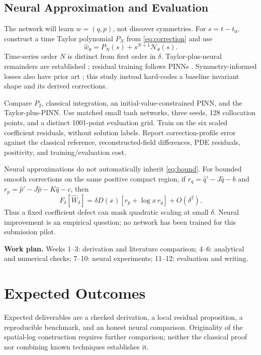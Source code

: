 \documentclass[12pt,a4paper]{article}
\begin{document}
\newpage
\subsection{Neural Approximation and Evaluation}
The network will learn $w=(q,p)$, not discover symmetries. For $s=t-t_0$, construct a time Taylor polynomial $P_N$ from \eqref{eq:correction} and use
\[
\widehat w_\theta=P_N(s)+s^{N+1}\mathcal N_\theta(s).
\]
Time-series order $N$ is distinct from first order in $\delta$. Taylor-plus-neural remainders are established \cite{taylor}; residual training follows PINNs \cite{pinn}. Symmetry-informed losses also have prior art \cite{liepinn}; this study instead hard-codes a baseline invariant shape and its derived corrections.

Compare $P_2$, classical integration, an initial-value-constrained PINN, and the Taylor-plus-PINN. Use matched small tanh networks, three seeds, 128 collocation points, and a distinct 1001-point evaluation grid. Train on the six scaled coefficient residuals, without solution labels. Report correction-profile error against the classical reference, reconstructed-field differences, PDE residuals, positivity, and training/evaluation cost.

Neural approximations do not automatically inherit \eqref{eq:bound}. For bounded smooth corrections on the same positive compact region, if
$r_q=\widehat q'-J\widehat q-b$ and $r_p=\widehat p'-J\widehat p-K\widehat q-c$, then
\[
F_\delta[\widehat W_\delta]
=\delta D(x)[r_p+\log x\,r_q]+O(\delta^2).
\]
Thus a fixed coefficient defect can mask quadratic scaling at small $\delta$. Neural improvement is an empirical question; no network has been trained for this submission pilot.

\textbf{Work plan.} Weeks 1--3: derivation and literature comparison; 4--6: analytical and numerical checks; 7--10: neural experiments; 11--12: evaluation and writing.

\section{Expected Outcomes}
Expected deliverables are a checked derivation, a local residual proposition, a reproducible benchmark, and an honest neural comparison. Originality of the spatial-log construction requires further comparison; neither the classical proof nor combining known techniques establishes it.
\end{document}
